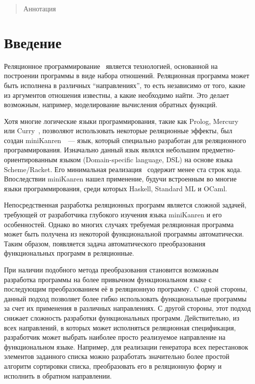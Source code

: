 \maketitle

\begin{abstract}
Аннотация
\end{abstract}

\section{Введение}
Реляционное программирование~\cite{lozov-spbu:TheReasonedSchemer} является технологией, основанной на построении программы в виде набора отношений. Реляционная программа может быть исполнена в различных  ``направлениях'', то есть независимо от того, какие из аргументов отношения известны, а какие необходимо найти. Это делает возможным, например, моделирование вычисления обратных функций. 

Хотя многие логические языки программирования, такие как Prolog, Mercury~\cite{lozov-spbu:Mercury} или Curry~\cite{lozov-spbu:Curry}, позволяют использовать некоторые реляционные эффекты, был создан miniKanren~\cite{lozov-spbu:mkanren}~--- язык, который специально разработан для реляционного программирования. Изначально данный язык являлся небольшим предметно-ориентированным языком (Domain-specific language, DSL) на основе языка Scheme/Racket. Его минимальная реализация~\cite{lozov-spbu:implementation} содержит менее ста строк кода. Впоследствии miniKanren нашел применение, будучи встроенным во многие языки программирования, среди которых Haskell, Standard ML и OCaml.

Непосредственная разработка реляционных программ является сложной задачей, требующей от разработчика глубокого изучения языка \linebreak miniKanren и его особенностей. Однако во многих случаях требуемая реляционная программа может быть получена из некоторой функциональной программы автоматически. Таким образом, появляется задача автоматического преобразования функциональных программ в реляционные. 

При наличии подобного метода преобразования становится возможным разработка программы на более привычном функциональном языке с последующим преобразованием её в реляционную программу. C одной стороны, данный подход позволяет более гибко использовать функциональные программы за счет их применения в различных направлениях. С другой стороны, этот подход снижает сложность разработки функциональных программ. Действительно, из всех направлений, в которых может исполняться реляционная спецификация, разработчик может выбрать наиболее просто реализуемое направление на функциональном языке. Например, для реализации генератора всех перестановок элементов заданного списка можно разработать значительно более простой алгоритм сортировки списка, преобразовать его в реляционную форму и исполнить в обратном направлении.

